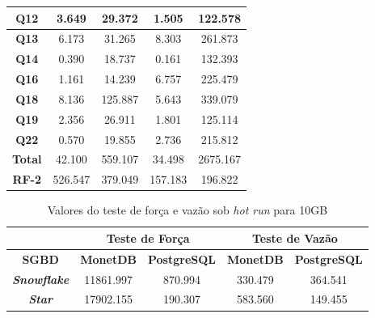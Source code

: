 \begin{table}[t]
\begin{tabular}{|c|c|c|c|c|}
                 \textbf{Q12}         & 3.649             & 29.372                        & 1.505             & 122.578                   \\ 
                \hline
                 \textbf{Q13}         & 6.173             & 31.265                        & 8.303             & 261.873                   \\ 
                \hline
                 \textbf{Q14}         & 0.390             & 18.737                        & 0.161             & 132.393                   \\ 
                \hline
                 \textbf{Q16}         & 1.161             & 14.239                        & 6.757             & 225.479                   \\ 
                \hline
                 \textbf{Q18}         & 8.136             & 125.887                       & 5.643             & 339.079                   \\ 
                \hline
                 \textbf{Q19}         & 2.356             & 26.911                        & 1.801             & 125.114                   \\ 
                \hline
                 \textbf{Q22}         & 0.570             & 19.855                        & 2.736             & 215.812                   \\ 
                \hline
                 \textbf{Total}       & 42.100            & 559.107                       & 34.498            & 2675.167                  \\ 
                \hline
                 \textbf{RF-2}        & 526.547           & 379.049                       & 157.183           & 196.822                   \\
                \hline
                \end{tabular}
                \end{table}

\begin{table}[htpb]
        \centering
        \caption{Valores do teste de força e vazão sob \textit{hot run} para 10GB}
        \label{tab:forca_vazao_hot_10}
        \begin{tabular}{|c|c|c|c|c|} 
                \cline{2-5}
                \multicolumn{1}{c|}{}         & \multicolumn{2}{c|}{\textbf{Teste de Força} } & \multicolumn{2}{c|}{\textbf{Teste de Vazão} }  \\ 
                \hline
                 \textbf{SGBD}                & \textbf{MonetDB}  & \textbf{PostgreSQL}       & \textbf{MonetDB}  & \textbf{PostgreSQL}        \\ 
                \hline
                 \textit{\textbf{Snowflake}}  & 11861.997         & 870.994                   & 330.479           & 364.541                    \\ 
                \hline
                 \textit{\textbf{Star}}       & 17902.155         & 190.307                   & 583.560           & 149.455                    \\
                \hline
                \end{tabular}
                \end{table}

